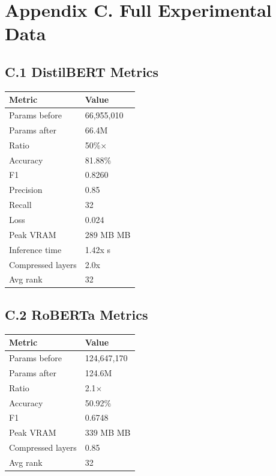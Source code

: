 
\section{Appendix C. Full Experimental Data}

\subsection{C.1 DistilBERT Metrics}

\begin{table}[H]
\centering
\small
\begin{tabular}{ll}
\toprule
\textbf{Metric} & \textbf{Value} \\
\midrule
Params before & 66,955,010 \\
Params after & 66.4M \\
Ratio & 50\%$\times$ \\
Accuracy & 81.88\% \\
F1 & 0.8260 \\
Precision & 0.85 \\
Recall & 32 \\
Loss & 0.024 \\
Peak VRAM & 289 MB MB \\
Inference time & 1.42x s \\
Compressed layers & 2.0x \\
Avg rank & 32 \\
\bottomrule
\end{tabular}
\end{table}

\subsection{C.2 RoBERTa Metrics}

\begin{table}[H]
\centering
\small
\begin{tabular}{ll}
\toprule
\textbf{Metric} & \textbf{Value} \\
\midrule
Params before & 124,647,170 \\
Params after & 124.6M \\
Ratio & 2.1$\times$ \\
Accuracy & 50.92\% \\
F1 & 0.6748 \\
Peak VRAM & 339 MB MB \\
Compressed layers & 0.85 \\
Avg rank & 32 \\
\bottomrule
\end{tabular}
\end{table}

